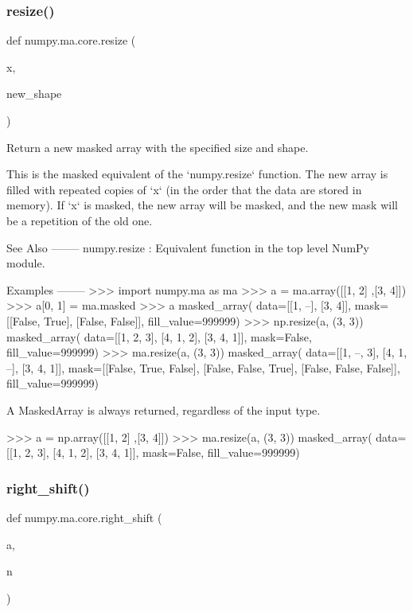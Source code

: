 \subsubsection{\texorpdfstring{resize()}{resize()}}
{\footnotesize\ttfamily def numpy.\+ma.\+core.\+resize (\begin{DoxyParamCaption}\item[{}]{x,  }\item[{}]{new\+\_\+shape }\end{DoxyParamCaption})}

\begin{DoxyVerb}Return a new masked array with the specified size and shape.

This is the masked equivalent of the `numpy.resize` function. The new
array is filled with repeated copies of `x` (in the order that the
data are stored in memory). If `x` is masked, the new array will be
masked, and the new mask will be a repetition of the old one.

See Also
--------
numpy.resize : Equivalent function in the top level NumPy module.

Examples
--------
>>> import numpy.ma as ma
>>> a = ma.array([[1, 2] ,[3, 4]])
>>> a[0, 1] = ma.masked
>>> a
masked_array(
  data=[[1, --],
        [3, 4]],
  mask=[[False,  True],
        [False, False]],
  fill_value=999999)
>>> np.resize(a, (3, 3))
masked_array(
  data=[[1, 2, 3],
        [4, 1, 2],
        [3, 4, 1]],
  mask=False,
  fill_value=999999)
>>> ma.resize(a, (3, 3))
masked_array(
  data=[[1, --, 3],
        [4, 1, --],
        [3, 4, 1]],
  mask=[[False,  True, False],
        [False, False,  True],
        [False, False, False]],
  fill_value=999999)

A MaskedArray is always returned, regardless of the input type.

>>> a = np.array([[1, 2] ,[3, 4]])
>>> ma.resize(a, (3, 3))
masked_array(
  data=[[1, 2, 3],
        [4, 1, 2],
        [3, 4, 1]],
  mask=False,
  fill_value=999999)\end{DoxyVerb}
 \mbox{\label{namespacenumpy_1_1ma_1_1core_ace97fe28919c884179e2856520737c66}} 
\subsubsection{\texorpdfstring{right\+\_\+shift()}{right\_shift()}}
{\footnotesize\ttfamily def numpy.\+ma.\+core.\+right\+\_\+shift (\begin{DoxyParamCaption}\item[{}]{a,  }\item[{}]{n }\end{DoxyParamCaption})}

